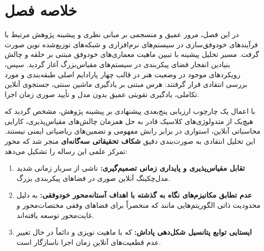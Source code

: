 \documentclass[oneside,openany,phd]{TMU-Thesis}
\begin{document}
\begin{table}[htbp]
\centering
\caption{نحوه پوشش شکاف‌های تحقیقاتی توسط نوآوری‌های معماری پیشنهادی RS-DRL}
\label{tab:ch3_positioning}
\end{table}

\section{خلاصه فصل}
\label{sec:ch3_summary}

در این فصل، مرور عمیق و منسجمی بر مبانی نظری و پیشینه پژوهش مرتبط با فرآیندهای خودوفق‌سازی در سیستم‌های نرم‌افزاری و شبکه‌های توزیع‌شده نوین صورت گرفت. مسیر تحلیل پیشینه با تبیین ماهیت معماری‌های خودوفق مبتنی بر حلقه  و چالش بنیادین انفجار فضای پیکربندی در سیستم‌های مقیاس‌بزرگ آغاز گردید. سپس، رویکردهای موجود در وضعیت هنر در قالب چهار پارادایم اصلی طبقه‌بندی و مورد بررسی انتقادی قرار گرفتند: هرس مبتنی بر یادگیری ماشین سنتی، جستجوی آنلاین تکاملی، یادگیری تقویتی عمیق بدون مدل و تأیید صوری زمان اجرا.

با اعمال یک چارچوب ارزیابی پنج‌بعدی پیشنهادی بر پیشینه پژوهش، مشخص گردید که هیچ‌یک از متدولوژی‌های کلاسیک قادر به حل همزمان چالش‌های مقیاس‌پذیری، کارایی محاسباتی آنلاین، استواری در برابر رانش مفهومی و تضمین‌های ریاضیاتی ایمنی نیستند. این تحلیل انتقادی به صورت‌بندی دقیق \textbf{شکاف تحقیقاتی سه‌گانه‌ای} منجر شد که محور تمرکز علمی این رساله را تشکیل می‌دهد:
\begin{enumerate}
    \item \textbf{تقابل مقیاس‌پذیری و پایداری زمانی تصمیم‌گیری:} ناشی از سربار زمانی شدید مدل‌چکینگ آنلاین صوری در فضاهای پیکربندی بزرگ.
    \item \textbf{عدم تطابق مکانیزم‌های نگاه به گذشته با اهداف آستانه‌محور خودوفقی:} به دلیل محدودیت ذاتی الگوریتم‌هایی مانند  که منحصراً برای فضاهای وفقی مختصات‌محور و غایت‌محور توسعه یافته‌اند.
    \item \textbf{ایستایی توابع پتانسیل شکل‌دهی پاداش:} که با ماهیت نویزی و دائماً در حال تغییر عدم قطعیت‌های آنلاین زمان اجرا ناسازگار است.
\end{enumerate}
\end{document}
